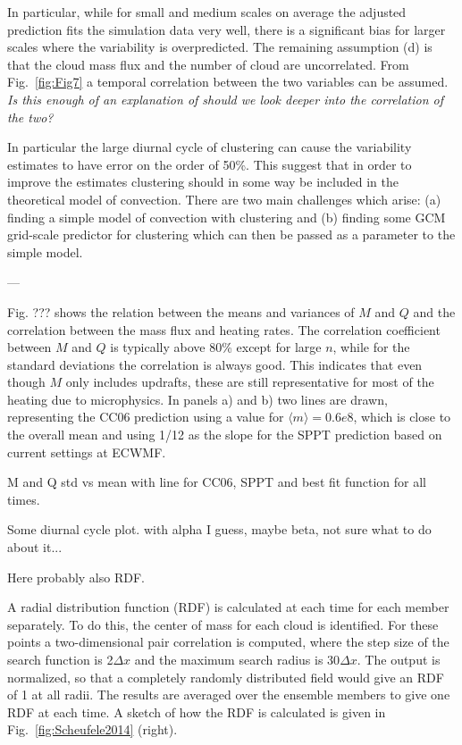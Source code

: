 \documentclass[a4paper, 12pt]{article}
\begin{document}
In particular, while for small and medium scales on average the adjusted prediction fits the simulation data very well, there is a significant bias for larger scales where the variability is overpredicted. The remaining assumption (d) is that the cloud mass flux and the number of cloud are uncorrelated. From Fig.~\ref{fig:Fig7} a temporal correlation between the two variables can be assumed. \textit{Is this enough of an explanation of should we look deeper into the correlation of the two?}

In particular the large diurnal cycle of clustering can cause the variability estimates to have error on the order of 50\%. This suggest that in order to improve the estimates clustering should in some way be included in the theoretical model of convection. There are two main challenges which arise: (a) finding a simple model of convection with clustering and (b) finding some GCM grid-scale predictor for clustering which can then be passed as a parameter to the simple model. 




---

Fig. ??? shows the relation between the means and variances of $M$ and $Q$ and the correlation between the mass flux and heating rates. The correlation coefficient between $M$ and $Q$ is typically above 80\% except for large $n$, while for the standard deviations the correlation is always good. This indicates that even though $M$ only includes updrafts, these are still representative for most of the heating due to microphysics. In panels a) and b) two lines are drawn, representing the CC06 prediction using a value for $\langle m \rangle = 0.6e8$, which is close to the overall mean and using 1/12 as the slope for the SPPT prediction based on current settings at ECWMF. 

M and Q std vs mean with line for CC06, SPPT and best fit function for all times. 

Some diurnal cycle plot. with alpha I guess, maybe beta, not sure what to do about it...

Here probably also RDF.

A radial distribution function (RDF) is calculated at each time for each member separately. To do this, the center of mass for each cloud is identified. For these points a two-dimensional pair correlation is computed, where the step size of the search function is 2$\Delta x$ and the maximum search radius is 30$\Delta x$. The output is normalized, so that a completely randomly distributed field would give an RDF of 1 at all radii. The results are averaged over the ensemble members to give one RDF at each time. A sketch of how the RDF is calculated is given in Fig.~\ref{fig:Scheufele2014} (right).
\end{document}
